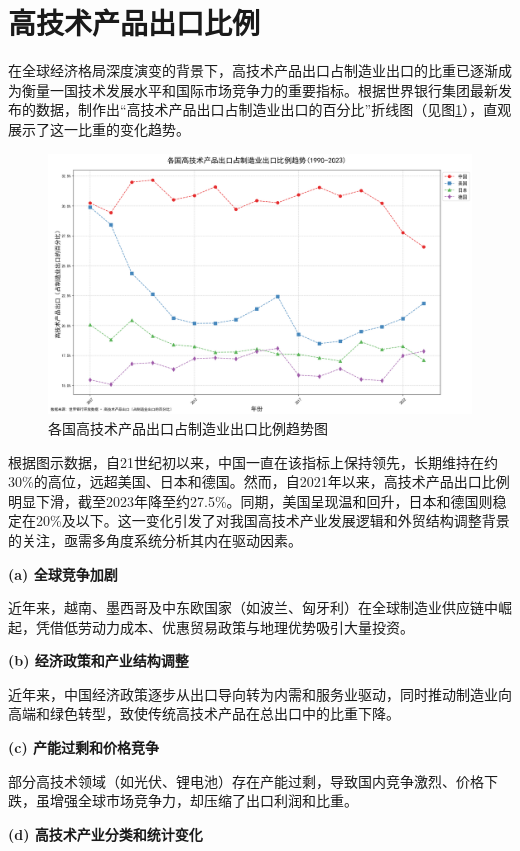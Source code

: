 \section{高技术产品出口比例}
在全球经济格局深度演变的背景下，高技术产品出口占制造业出口的比重已逐渐成为衡量一国技术发展水平和国际市场竞争力的重要指标。根据世界银行集团最新发布的数据，制作出“高技术产品出口占制造业出口的百分比”折线图（见图\ref{各国高技术产品出口占制造业出口比例趋势图}），直观展示了这一比重的变化趋势。

\begin{figure}[H]
    \centering
    \includegraphics[width=0.7\linewidth]{figure/23各国高技术产品出口占制造业出口比例趋势图.png}
    \caption{各国高技术产品出口占制造业出口比例趋势图}
    \label{各国高技术产品出口占制造业出口比例趋势图}
\end{figure}

根据图示数据，自21世纪初以来，中国一直在该指标上保持领先，长期维持在约30\%的高位，远超美国、日本和德国。然而，自2021年以来，高技术产品出口比例明显下滑，截至2023年降至约27.5\%。同期，美国呈现温和回升，日本和德国则稳定在20\%及以下。这一变化引发了对我国高技术产业发展逻辑和外贸结构调整背景的关注，亟需多角度系统分析其内在驱动因素。

\textbf{(a) 全球竞争加剧}

近年来，越南、墨西哥及中东欧国家（如波兰、匈牙利）在全球制造业供应链中崛起，凭借低劳动力成本、优惠贸易政策与地理优势吸引大量投资。

\textbf{(b) 经济政策和产业结构调整}

近年来，中国经济政策逐步从出口导向转为内需和服务业驱动，同时推动制造业向高端和绿色转型，致使传统高技术产品在总出口中的比重下降。

\textbf{(c) 产能过剩和价格竞争}

部分高技术领域（如光伏、锂电池）存在产能过剩，导致国内竞争激烈、价格下跌，虽增强全球市场竞争力，却压缩了出口利润和比重。

\textbf{(d) 高技术产业分类和统计变化}

